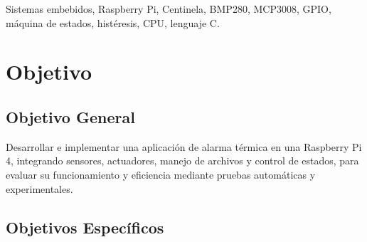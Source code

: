 \documentclass[conference]{IEEEtran}
\begin{document}
\begin{abstract}
Este reporte documenta el desarrollo y las pruebas de Centinela, una aplicación de alarma térmica implementada en una Raspberry Pi 4 mediante lenguaje C. El sistema integra un sensor BMP280 para medir temperatura, un potenciómetro conectado mediante el convertidor MCP3008 para establecer un umbral, cuatro LEDs para indicar el estado de vigilancia y dos botones para controlar y consultar el funcionamiento. Se implementó una máquina de estados con las condiciones VIGILANDO, ALARMA y PAUSADO, además de un mecanismo de histéresis para evitar cambios continuos de estado. La práctica incluyó pruebas automáticas de lógica, ejecución sobre hardware real, registro de mediciones en un archivo CSV y evaluación del consumo de CPU con diferentes periodos de muestreo. Se alcanzaron 43 de 43 pruebas de lógica y se analizaron los resultados experimentales, incluyendo los problemas de comunicación observados durante la ejecución y las diferencias entre las configuraciones de eficiencia.
\end{abstract}

\begin{IEEEkeywords}
Sistemas embebidos, Raspberry Pi, Centinela, BMP280, MCP3008, GPIO, máquina de estados, histéresis, CPU, lenguaje C.
\end{IEEEkeywords}


\section{Objetivo}

\subsection{Objetivo General}

Desarrollar e implementar una aplicación de alarma térmica en una Raspberry Pi 4, integrando sensores, actuadores, manejo de archivos y control de estados, para evaluar su funcionamiento y eficiencia mediante pruebas automáticas y experimentales.

\subsection{Objetivos Específicos}
\end{document}
